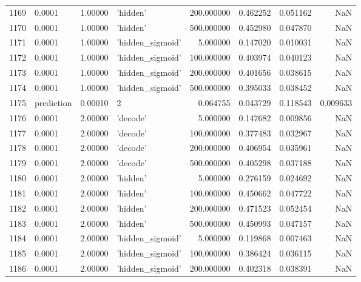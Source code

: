 \documentclass[10pt,a4paper]{article}
\begin{document}
\begin{tabular}{llrlrrrr}
1169 &      0.0001 &   1.00000 &           'hidden' &  200.000000 &  0.462252 &  0.051162 &       NaN \\
1170 &      0.0001 &   1.00000 &           'hidden' &  500.000000 &  0.452980 &  0.047870 &       NaN \\
1171 &      0.0001 &   1.00000 &   'hidden\_sigmoid' &    5.000000 &  0.147020 &  0.010031 &       NaN \\
1172 &      0.0001 &   1.00000 &   'hidden\_sigmoid' &  100.000000 &  0.403974 &  0.040123 &       NaN \\
1173 &      0.0001 &   1.00000 &   'hidden\_sigmoid' &  200.000000 &  0.401656 &  0.038615 &       NaN \\
1174 &      0.0001 &   1.00000 &   'hidden\_sigmoid' &  500.000000 &  0.395033 &  0.038452 &       NaN \\
1175 &  prediction &   0.00010 &                  2 &    0.064755 &  0.043729 &  0.118543 &  0.009633 \\
1176 &      0.0001 &   2.00000 &           'decode' &    5.000000 &  0.147682 &  0.009856 &       NaN \\
1177 &      0.0001 &   2.00000 &           'decode' &  100.000000 &  0.377483 &  0.032967 &       NaN \\
1178 &      0.0001 &   2.00000 &           'decode' &  200.000000 &  0.406954 &  0.035961 &       NaN \\
1179 &      0.0001 &   2.00000 &           'decode' &  500.000000 &  0.405298 &  0.037188 &       NaN \\
1180 &      0.0001 &   2.00000 &           'hidden' &    5.000000 &  0.276159 &  0.024692 &       NaN \\
1181 &      0.0001 &   2.00000 &           'hidden' &  100.000000 &  0.450662 &  0.047722 &       NaN \\
1182 &      0.0001 &   2.00000 &           'hidden' &  200.000000 &  0.471523 &  0.052454 &       NaN \\
1183 &      0.0001 &   2.00000 &           'hidden' &  500.000000 &  0.450993 &  0.047157 &       NaN \\
1184 &      0.0001 &   2.00000 &   'hidden\_sigmoid' &    5.000000 &  0.119868 &  0.007463 &       NaN \\
1185 &      0.0001 &   2.00000 &   'hidden\_sigmoid' &  100.000000 &  0.386424 &  0.036115 &       NaN \\
1186 &      0.0001 &   2.00000 &   'hidden\_sigmoid' &  200.000000 &  0.402318 &  0.038391 &       NaN \\

\end{tabular}
\end{document}
